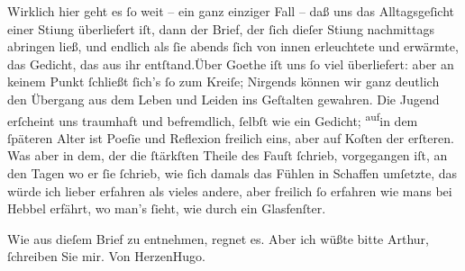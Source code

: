 \pstart
           Wirklich hier geht es ſo weit – ein ganz einziger Fall – daß uns das Alltagsgeſicht
               einer Sti{\geminationm}ung überliefert iſt, dann der Brief, der ſich
               dieſer Sti{\geminationm}ung nachmittags abringen ließ, und endlich
               als ſie abends ſich von innen erleuchtete und erwärmte, das Gedicht, das aus ihr
                  entſtand.\hspace*{1.5em}Über Goethe iſt uns ſo viel überliefert: aber an keinem Punkt ſchließt ſich’s ſo
               zum Kreiſe; Nirgends können wir ganz deutlich den Übergang aus dem Leben und Leiden
               ins Geſtalten gewahren. Die Jugend erſcheint uns traumhaft und befremdlich, ſelbſt
               wie ein Gedicht; \substVorne{}\textsuperscript{auf}\substDazwischen{}in\substHinten{} dem ſpäteren Alter ist Poeſie und Reflexion freilich eins, aber auf Koſten
               der erſteren. Was aber in dem, der die ſtärkſten Theile des Fauſt ſchrieb, vorgegangen iſt, an den Tagen wo er ſie ſchrieb,
               wie ſich damals das Fühlen in Schaffen umſetzte, das würde ich lieber erfahren als
               vieles andere, aber freilich ſo erfahren wie mans bei Hebbel erfährt, wo man’s ſieht, wie durch ein Glasfenſter.\pend
           
\pstart
           Wie aus dieſem Brief zu entnehmen, regnet es. Aber ich wüßte \label{T_L01297-1v}\label{T_L01297-1} bitte
               Arthur, ſchreiben Sie mir.\pend
           \pstart Von Herzen\spacefill\mbox{Hugo.}\pend{}\endnumbering{}  
      